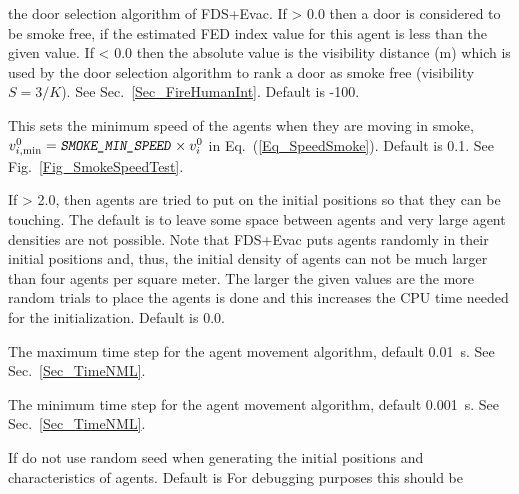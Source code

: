 \documentclass[12pt,a4paper,final,twoside]{stylevk}
\begin{document}
\begin{description}
  the door selection algorithm of FDS+Evac.  If > 0.0 then a door is
  considered to be smoke free, if the estimated FED index value for
  this agent is less than the given value.  If < 0.0 then the absolute
  value is the visibility distance (m) which is used by the door
  selection algorithm to rank a door as smoke free (visibility $S =
  3/K$). See Sec.~\ref{Sec_FireHumanInt}.  Default is -100.
%
\item[\Timts{SMOKE\_MIN\_SPEED}] This sets the minimum speed of the
  agents when they are moving in smoke, $v^0_{i,\mathrm{min}} =
  \textnormal{\texttt{\textsl{SMOKE\_MIN\_SPEED}}} \times v^0_i$ in Eq.~(\ref{Eq_SpeedSmoke}).
  Default is 0.1.  See Fig.~\ref{Fig_SmokeSpeedTest}.
%
%
\item[\Timts{DENS\_INIT}] If > 2.0, then agents are tried to put on
  the initial positions so that they can be touching.  The default is
  to leave some space between agents and very large agent densities
  are not possible.  Note that FDS+Evac puts agents randomly in their
  initial positions and, thus, the initial density of agents can not
  be much larger than four agents per square meter.  The larger the
  given values are the more random trials to place the agents is done
  and this increases the CPU time needed for the initialization.
  Default is 0.0.
%
\item[\Timts{EVAC\_DT\_MAX}] The maximum time step for the agent
  movement algorithm, default 0.01~s.  See Sec.~\ref{Sec_TimeNML}.
%
\item[\Timts{EVAC\_DT\_MIN}] The minimum time step for the agent
  movement algorithm, default 0.001~s.  See Sec.~\ref{Sec_TimeNML}.
%
\item[\Timts{NOT\_RANDOM}] If  do not use random seed
  when generating the initial positions and characteristics of agents.
  Default is   For debugging purposes this should be

\end{description}
\end{document}
